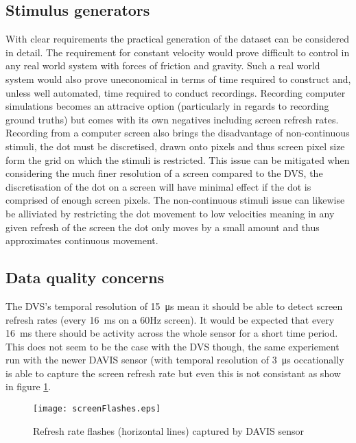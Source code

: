 \subsection{Stimulus generators}
With clear requirements the practical generation of the dataset can be considered in detail.
The requirement for constant velocity would prove difficult to control in any real world system with forces of friction and gravity.
Such a real world system would also prove uneconomical in terms of time required to construct and, unless well automated, time required to conduct recordings. 
Recording computer simulations becomes an attracive option (particularly in regards to recording ground truths) but comes with its own negatives including screen refresh rates.
Recording from a computer screen also brings the disadvantage of non-continuous stimuli, the dot must be discretised, drawn onto pixels and thus screen pixel size form the grid on which the stimuli is restricted. 
This issue can be mitigated when considering the much finer resolution of a screen compared to the DVS, the discretisation of the dot on a screen will have minimal effect if the dot is comprised of enough screen pixels.
The non-continuous stimuli issue can likewise be alliviated by restricting the dot movement to low velocities meaning in any given refresh of the screen the dot only moves by a small amount and thus approximates continuous movement. 


\subsection{Data quality concerns}

The DVS's temporal resolution of \SI{15}{\micro\second} mean it should be able to detect screen refresh rates (every \SI{16}{\milli\second} on a 60Hz screen). 
It would be expected that every \SI{16}{\milli\second} there should be activity across the whole sensor for a short time period. 
This does not seem to be the case with the DVS though, the same experiement run with the newer DAVIS sensor (with temporal resolution of \SI{3}{\micro\second} occationally is able to capture the screen refresh rate but even this is not consistant as show in figure \ref{fig:refreshFlashes}.


\begin{figure}
    \centering
    \texttt{[image: screenFlashes.eps]}
    \caption{Refresh rate flashes (horizontal lines) captured by DAVIS sensor}
    \label{fig:refreshFlashes}
\end{figure}

